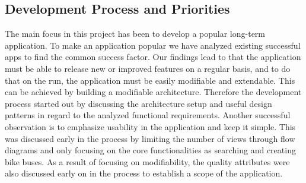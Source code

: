 





\subsection{Development Process and Priorities}

The main focus in this project has been to develop a popular long-term application. To make an application popular we have analyzed existing successful apps to find the common success factor. Our findings lead to that the application must be able to release new or improved features on a regular basis, and to do that on the run, the application must be easily modifiable and extendable. This can be achieved by building a modifiable architecture. Therefore the development process started out by discussing the architecture setup and useful design patterns in regard to the analyzed functional requirements. Another successful observation is to emphasize usability in the application and keep it simple. This was discussed early in the process by limiting the number of views through flow diagrams and only focusing on the core functionalities as searching and creating bike buses. As a result of focusing on modifiability, the quality attributes were also discussed early on in the process to establish a scope of the application.

